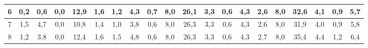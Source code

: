 \begin{sidewaystable}[]
\begin{tabular}{|c|c|c|c|c|c|c|c|c|c|c|c|c|c|c|c|c|c|c|c|}
    6  & 0,2                                             & 0,6                                             & 0,0                                             & 12,9                                             & 1,6                                              & 1,2                                              & 4,3                                              & 0,7                                              & 8,0                                              & 26,1                                             & 3,3                                              & 0,6                                              & 4,3                                              & 2,6                                              & 8,0                                              & 32,6                                             & 4,1                                              & 0,9                                              & 5,7                                              \\ \hline
    7  & 1,5                                             & 4,7                                             & 0,0                                             & 10,8                                             & 1,4                                              & 1,0                                              & 3,8                                              & 0,6                                              & 8,0                                              & 26,3                                             & 3,3                                              & 0,6                                              & 4,3                                              & 2,6                                              & 8,0                                              & 31,9                                             & 4,0                                              & 0,9                                              & 5,8                                              \\ \hline
    8  & 1,2                                             & 3,8                                             & 0,0                                             & 12,4                                             & 1,6                                              & 1,5                                              & 4,8                                              & 0,6                                              & 8,0                                              & 26,3                                             & 3,3                                              & 0,6                                              & 4,3                                              & 2,7                                              & 8,0                                              & 35,4                                             & 4,4                                              & 1,2                                              & 6,4                                              \\ \hline

\end{tabular}
\end{sidewaystable}
